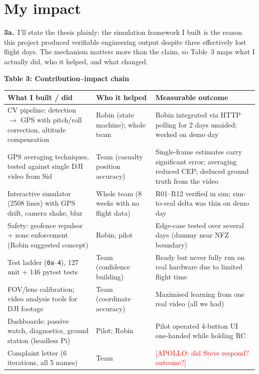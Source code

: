 \section{My impact}

\textbf{3a.}~I'll state the thesis plainly: the simulation framework I built is the reason this project produced verifiable engineering output despite three effectively lost flight days. The mechanism matters more than the claim, so Table~3 maps what I actually did, who it helped, and what changed.

\vspace{0.2em}
{\small
\noindent\textbf{Table 3: Contribution--impact chain}

\begin{tabularx}{\textwidth}{@{}L L L@{}}
\toprule
\textbf{What I built / did} & \textbf{Who it helped} & \textbf{Measurable outcome} \\
\midrule
CV pipeline: detection $\to$ GPS with pitch/roll correction, altitude compensation & Robin (state machine); whole team & Robin integrated via HTTP polling for 2 days unaided; worked on demo day \\
GPS averaging techniques, tested against single DJI video from Sid & Team (casualty position accuracy) & Single-frame estimates carry significant error; averaging reduced CEP; deduced ground truth from the video \\
Interactive simulator (2508 lines) with GPS drift, camera shake, blur & Whole team (8 weeks with no flight data) & R01--R12 verified in sim; sim-to-real delta was thin on demo day \\
Safety: geofence repulsor + zone enforcement (Robin suggested concept) & Robin; pilot & Edge-case tested over several days (dummy near NFZ boundary) \\
Test ladder (\texttt{0a}--\texttt{4}), 127 unit + 146 pytest tests & Team (confidence building) & Ready but never fully run on real hardware due to limited flight time \\
FOV/lens calibration; video analysis tools for DJI footage & Team (coordinate accuracy) & Maximised learning from one real video (all we had) \\
Dashboards: passive watch, diagnostics, ground station (headless Pi) & Pilot; Robin & Pilot operated 4-button UI one-handed while holding RC \\
Complaint letter (6 iterations, all 5 names) & Team & \textcolor{red}{[APOLLO: did Steve respond? outcome?]} \\
\bottomrule
\end{tabularx}
}
\vspace{0.2em}

